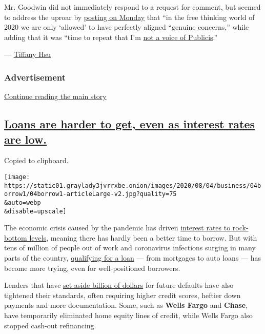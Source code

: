 Mr. Goodwin did not immediately respond to a request for comment, but
seemed to address the uproar by
\href{https://twitter.com/tomfgoodwin/status/1290340999672332291}{posting
on Monday} that ``in the free thinking world of 2020 we are only
`allowed' to have perfectly aligned ``genuine concerns,'' while adding
that it was ``time to repeat that I'm
\href{https://twitter.com/tomfgoodwin/status/1290325449529274370?s=20}{not
a voice of Publicis}.''

--- \href{https://www.nytimes3xbfgragh.onion/by/tiffany-hsu}{Tiffany
Hsu}

\hypertarget{advertisement-1}{%
\subsubsection{Advertisement}\label{advertisement-1}}

\protect\hyperlink{after-dfp-ad-mid2}{Continue reading the main story}

\hypertarget{loans-are-harder-to-get-even-as-interest-rates-are-low}{%
\subsection{\texorpdfstring{\protect\hyperlink{loans-are-harder-to-get-even-as-interest-rates-are-low}{Loans
are harder to get, even as interest rates are
low.}}{Loans are harder to get, even as interest rates are low.}}\label{loans-are-harder-to-get-even-as-interest-rates-are-low}}

Copied to clipboard.

\texttt{[image: https://static01.graylady3jvrrxbe.onion/images/2020/08/04/business/04borrow1/04borrow1-articleLarge-v2.jpg?quality=75\\\&auto=webp\\\&disable=upscale]}

The economic crisis caused by the pandemic has driven
\href{https://www.nytimes3xbfgragh.onion/2020/07/16/business/mortgage-rates-below-3-percent.html}{interest
rates to rock-bottom levels}, meaning there has hardly been a better
time to borrow. But with tens of million of people out of work and
coronavirus infections surging in many parts of the country,
\href{https://www.nytimes3xbfgragh.onion/2020/08/04/your-money/mortgage-loans-credit-cards-coronavirus.html}{qualifying
for a loan} --- from mortgages to auto loans --- has become more trying,
even for well-positioned borrowers.

Lenders that have
\href{https://www.nytimes3xbfgragh.onion/2020/07/14/business/big-banks-quarterly-results.html}{set
aside billion of dollars} for future defaults have also tightened their
standards, often requiring higher credit scores, heftier down payments
and more documentation. Some, such as \textbf{Wells Fargo} and
\textbf{Chase}, have temporarily eliminated home equity lines of credit,
while Wells Fargo also stopped cash-out refinancing.


